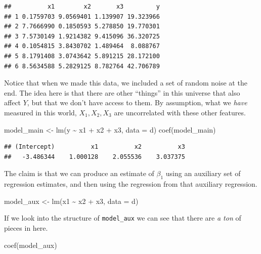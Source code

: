 \documentclass[
]{book}
\newenvironment{Shaded}{\begin{snugshade}}{\end{snugshade}}
\newcommand{\AttributeTok}[1]{\textcolor[rgb]{0.77,0.63,0.00}{#1}}
\newcommand{\FunctionTok}[1]{\textcolor[rgb]{0.00,0.00,0.00}{#1}}
\newcommand{\NormalTok}[1]{#1}
\newcommand{\OtherTok}[1]{\textcolor[rgb]{0.56,0.35,0.01}{#1}}
\newcommand{\SpecialCharTok}[1]{\textcolor[rgb]{0.00,0.00,0.00}{#1}}
\theoremstyle{definition}
\theoremstyle{definition}
\theoremstyle{definition}
\theoremstyle{definition}
\theoremstyle{remark}
\begin{document}
\begin{verbatim}
##          x1        x2       x3         y
## 1 0.1759703 9.0569401 1.139907 19.323966
## 2 7.7666990 0.1850593 5.278850 19.770301
## 3 7.5730149 1.9214382 9.415096 36.320725
## 4 0.1054815 3.8430702 1.489464  8.088767
## 5 8.1791408 3.0743642 5.891215 28.172100
## 6 8.5634588 5.2829125 8.782764 42.706789
\end{verbatim}

Notice that when we made this data, we included a set of random noise at the end. The idea here is that there are other ``things'' in this universe that also affect \(Y\), but that we don't have access to them. By assumption, what we \emph{have} measured in this world, \(X_1, X_2, X_3\) are uncorrelated with these other features.

\begin{Shaded}
\begin{Highlighting}[]
\NormalTok{model\_main }\OtherTok{\textless{}{-}} \FunctionTok{lm}\NormalTok{(y }\SpecialCharTok{\textasciitilde{}}\NormalTok{ x1 }\SpecialCharTok{+}\NormalTok{ x2 }\SpecialCharTok{+}\NormalTok{ x3, }\AttributeTok{data =}\NormalTok{ d)}
\FunctionTok{coef}\NormalTok{(model\_main)}
\end{Highlighting}
\end{Shaded}

\begin{verbatim}
## (Intercept)          x1          x2          x3 
##   -3.486344    1.000128    2.055536    3.037375
\end{verbatim}

The claim is that we can produce an estimate of \(\beta_1\) using an auxiliary set of regression estimates, and then using the regression from that auxiliary regression.

\begin{Shaded}
\begin{Highlighting}[]
\NormalTok{model\_aux }\OtherTok{\textless{}{-}} \FunctionTok{lm}\NormalTok{(x1 }\SpecialCharTok{\textasciitilde{}}\NormalTok{ x2 }\SpecialCharTok{+}\NormalTok{ x3, }\AttributeTok{data =}\NormalTok{ d)}
\end{Highlighting}
\end{Shaded}

If we look into the structure of \texttt{model\_aux} we can see that there are \emph{a ton} of pieces in here.

\begin{Shaded}
\begin{Highlighting}[]
\FunctionTok{coef}\NormalTok{(model\_aux)}
\end{Highlighting}
\end{Shaded}
\end{document}
